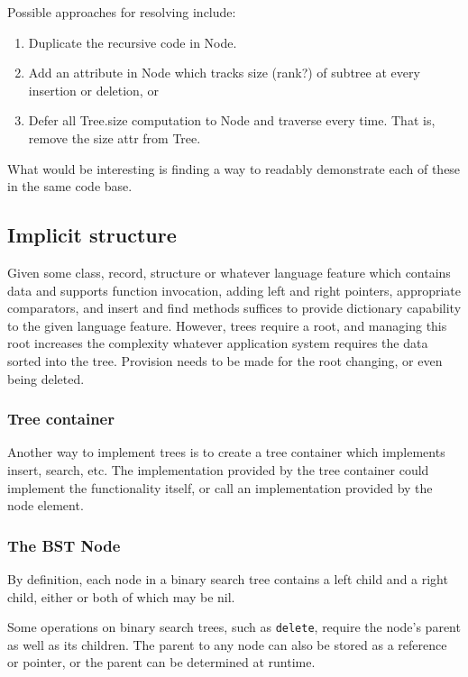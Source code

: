 Possible approaches for resolving include:

\begin{enumerate}
  \item Duplicate the recursive code in Node.
  \item Add an attribute in Node which tracks size (rank?) of subtree at every insertion or deletion, or
  \item Defer all Tree.size computation to Node and traverse every time. That is, remove the size attr from Tree.
\end{enumerate}

What would be interesting is finding a way to readably demonstrate each of these in the same code base.

\subsection{Implicit structure}

Given some class, record, structure or whatever language feature which contains
data and supports function invocation, adding left and right pointers,
appropriate comparators, and insert and find methods suffices to provide
dictionary capability to the given language feature. However, trees require a
root, and managing this root increases the complexity whatever application
system requires the data sorted into the tree. Provision needs to be made for
the root changing, or even being deleted.

\subsubsection{Tree container}

Another way to implement trees is to create a tree container which implements
insert, search, etc. The implementation provided by the tree container could
implement the functionality itself, or call an implementation provided by
the node element.

\subsubsection{The BST Node}

By definition, each node in a binary search tree contains a left child and
a right child, either or both of which may be nil.

Some operations on binary search trees, such as {\tt delete}, require
the node's parent as well as its children. The parent to any node can also
be stored as a reference or pointer, or the parent can be determined at
runtime.

